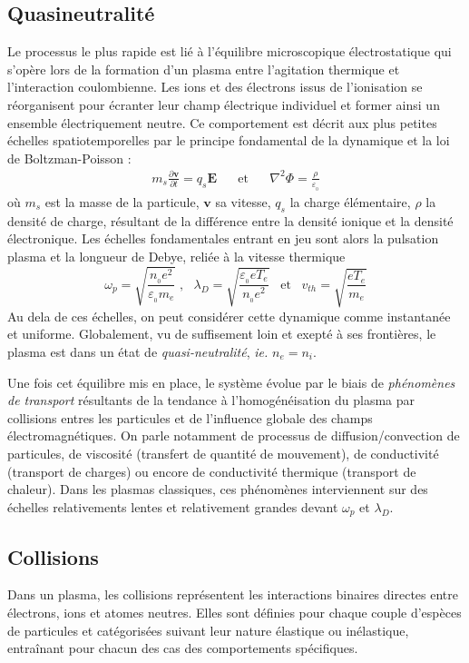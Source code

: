 		\subsection{Quasineutralité}
			Le processus le plus rapide est lié à
			l'équilibre microscopique électrostatique qui s'opère lors de la formation
			d'un plasma entre l'agitation thermique et l'interaction coulombienne. Les
			ions et des électrons issus de l'ionisation se réorganisent pour écranter
			leur champ électrique individuel et former ainsi un ensemble électriquement neutre. 
			Ce comportement est décrit aux plus petites échelles spatiotemporelles par
			le principe fondamental de la dynamique et la loi de Boltzman-Poisson :
			\begin{align}
				m_s\frac{\partial \mathbf{v}}{\partial t}=q_s\mathbf E
				\;\;\;\;\;\;\text{et}\;\;\;\;\;\;
				\nabla^2\Phi=\frac{\rho}{\varepsilon_{_0}}
			\end{align} 
			où $m_s$ est la masse de la particule, $\mathbf{v}$ sa vitesse, $q_s$ la
			charge élémentaire, $\rho$ la densité de charge, résultant de la différence entre la 
			densité ionique et la densité électronique.
			Les échelles fondamentales entrant en jeu sont alors la pulsation plasma et
			la longueur de Debye, reliée à la vitesse thermique 
			\begin{equation}
				\omega_p=\sqrt{\frac{n_{_0}e^2}{\varepsilon_{_0}
				m_e}}\;\text{,}\;\;\;\lambda_D=\sqrt{\frac{\varepsilon_{_0}
				eT_e}{n_{_0}e^2}}\;\;\;\text{et}\;\;\;v_{th}=\sqrt{\frac{eT_e}{m_e}}
			\end{equation}
			Au dela de ces échelles, on peut considérer cette dynamique comme instantanée
			et uniforme. Globalement, vu de suffisement loin et exepté à ses frontières,
			le plasma est dans un état de \emph{quasi-neutralité}, \emph{ie.} $n_e=n_i$.
			
			Une fois cet équilibre mis en place, le système évolue par le biais de
			\emph{phénomènes de transport} résultants de la tendance à
			l'homogénéisation du plasma par collisions entres les particules et de
			l'influence globale des champs électromagnétiques. On parle notamment de
			processus de diffusion/convection de particules, de viscosité (transfert de
			quantité de mouvement), de conductivité (transport de charges) ou encore de
			conductivité thermique (transport de chaleur). Dans les plasmas
			classiques, ces phénomènes interviennent sur des échelles relativements
			lentes et relativement grandes devant $\omega_p$ et $\lambda_D$.
		\subsection{Collisions}
			Dans un plasma, les collisions représentent les interactions binaires
			directes entre électrons, ions et atomes neutres. Elles sont
			définies pour chaque couple d'espèces de particules et catégorisées suivant
			leur nature élastique ou inélastique, entraînant pour chacun des cas des
			comportements spécifiques.
			
